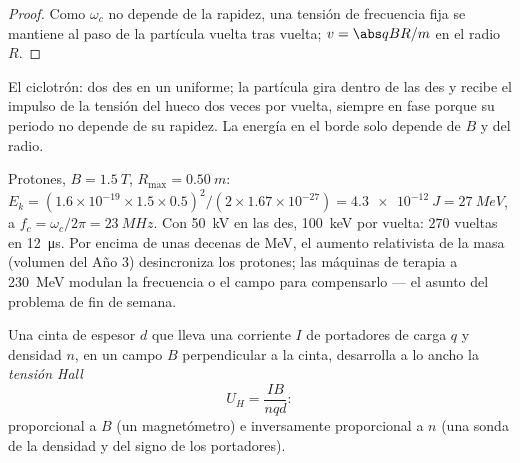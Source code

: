 \begin{proof}
Como $\omega_c$ no depende de la rapidez, una tensión de frecuencia fija se
mantiene al paso de la partícula vuelta tras vuelta; $v = \abs qBR/m$ en el
radio $R$.
\end{proof}

\begin{omfigure}

{\small El ciclotrón: dos des en un  uniforme; la partícula
gira dentro de las des y recibe el impulso de la tensión del hueco dos
veces por vuelta, siempre en fase porque su periodo no depende de su
rapidez. La energía en el borde solo depende de $B$ y del radio.}
\end{omfigure}

\begin{example}\label{ex:b1:charged-particles:medical}
Protones, $B = \qty{1.5}{T}$, $R_{\max} = \qty{0.50}{m}$: $E_k =
(1.6\times10^{-19} \times 1.5 \times 0.5)^2/(2 \times 1.67\times10^{-27}) =
\qty{4.3e-12}{J} = \qty{27}{MeV}$, a $f_c = \omega_c/2\pi = \qty{23}{MHz}$.
Con \qty{50}{kV} en las des, \qty{100}{keV} por vuelta: $270$ vueltas en
\qty{12}{\micro s}. Por encima de unas decenas de MeV, el aumento
relativista de la masa (volumen del Año 3) desincroniza los protones; las
máquinas de terapia a \qty{230}{MeV} modulan la frecuencia o el campo para
compensarlo --- el asunto del problema de fin de semana.
\end{example}

\begin{proposition}\label{prop:b1:charged-particles:hall}
Una cinta de espesor $d$ que lleva una corriente $I$ de portadores de carga
$q$ y densidad $n$, en un campo $B$ perpendicular a la cinta, desarrolla a
lo ancho la \emph{tensión Hall}
\[
U_H = \frac{IB}{nqd} :
\]
proporcional a $B$ (un magnetómetro) e inversamente proporcional a $n$ (una
sonda de la densidad y del signo de los portadores).
\end{proposition}

